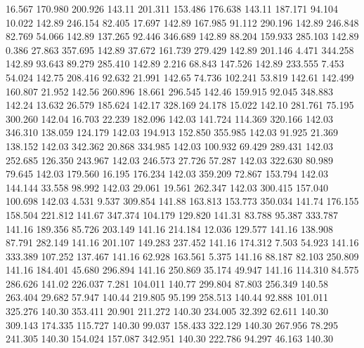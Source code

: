   16.567  170.980  200.926       143.11
 201.311  153.486  176.638       143.11
 187.171   94.104   10.022       142.89
 246.154   82.405   17.697       142.89
 167.985   91.112  290.196       142.89
 246.848   82.769   54.066       142.89
 137.265   92.446  346.689       142.89
  88.204  159.933  285.103       142.89
   0.386   27.863  357.695       142.89
  37.672  161.739  279.429       142.89
 201.146    4.471  344.258       142.89
  93.643   89.279  285.410       142.89
   2.216   68.843  147.526       142.89
 233.555    7.453   54.024       142.75
 208.416   92.632   21.991       142.65
  74.736  102.241   53.819       142.61
 142.499  160.807   21.952       142.56
 260.896   18.661  296.545       142.46
 159.915   92.045  348.883       142.24
  13.632   26.579  185.624       142.17
 328.169   24.178   15.022       142.10
 281.761   75.195  300.260       142.04
  16.703   22.239  182.096       142.03
 141.724  114.369  320.166       142.03
 346.310  138.059  124.179       142.03
 194.913  152.850  355.985       142.03
  91.925   21.369  138.152       142.03
 342.362   20.868  334.985       142.03
 100.932   69.429  289.431       142.03
 252.685  126.350  243.967       142.03
 246.573   27.726   57.287       142.03
 322.630   80.989   79.645       142.03
 179.560   16.195  176.234       142.03
 359.209   72.867  153.794       142.03
 144.144   33.558   98.992       142.03
  29.061   19.561  262.347       142.03
 300.415  157.040  100.698       142.03
   4.531    9.537  309.854       141.88
 163.813  153.773  350.034       141.74
 176.155  158.504  221.812       141.67
 347.374  104.179  129.820       141.31
  83.788   95.387  333.787       141.16
 189.356   85.726  203.149       141.16
 214.184   12.036  129.577       141.16
 138.908   87.791  282.149       141.16
 201.107  149.283  237.452       141.16
 174.312    7.503   54.923       141.16
 333.389  107.252  137.467       141.16
  62.928  163.561    5.375       141.16
  88.187   82.103  250.809       141.16
 184.401   45.680  296.894       141.16
 250.869   35.174   49.947       141.16
 114.310   84.575  286.626       141.02
 226.037    7.281  104.011       140.77
 299.804   87.803  256.349       140.58
 263.404   29.682   57.947       140.44
 219.805   95.199  258.513       140.44
  92.888  101.011  325.276       140.30
 353.411   20.901  211.272       140.30
 234.005   32.392   62.611       140.30
 309.143  174.335  115.727       140.30
  99.037  158.433  322.129       140.30
 267.956   78.295  241.305       140.30
 154.024  157.087  342.951       140.30
 222.786   94.297   46.163       140.30
